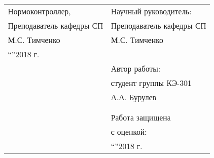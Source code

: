 \begin{article}
\begin{onehalfspace}
\Large
\begin{tabular}{ll}
Нормоконтроллер, \hspace{1cm}& Научный руководитель: \\
Преподаватель кафедры СП \hspace{1cm}& Преподаватель кафедры СП \\
\underline{\hspace{3cm}}М.С. Тимченко \hspace{1cm} & \underline{\hspace{3cm}}М.С. Тимченко \\
``\underline{\hspace{0.5cm}}''\underline{\hspace{3cm}}2018 г. \hspace{1cm} & \\
\hspace{1cm}& Автор работы: \\
\hspace{1cm}& студент группы КЭ-301 \\
\hspace{1cm}& \underline{\hspace{3cm}}А.А. Бурулев \\
&\\
&\\
& Работа защищена \\
& с оценкой: \underline{\hspace{3cm}} \\
& ``\underline{\hspace{0.5cm}}''\underline{\hspace{3cm}}2018 г.\\
\end{tabular}\
\end{onehalfspace}
\end{article} 



